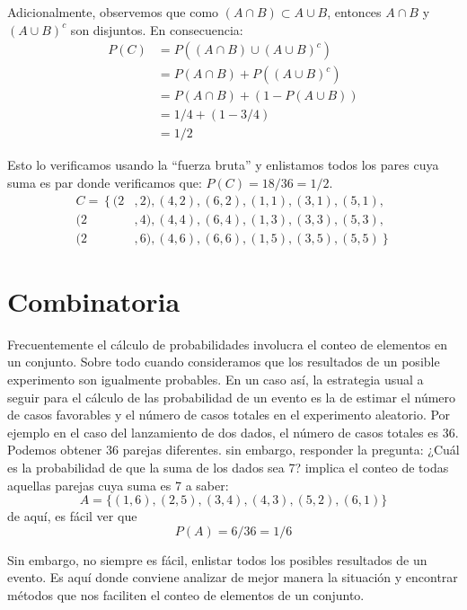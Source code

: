 \documentclass[14pt]{extreport}
\newcounter{ejemplo}[chapter]
\begin{document}
Adicionalmente, observemos que como $(A \cap B) \subset A \cup B$, entonces $A \cap B$ y $(A
  \cup B)^c$ son disjuntos. En consecuencia:
\begin{equation*}
  \begin{split}
    P(C ) & = P((A \cap B) \cup (A \cup B)^c ) \\
    & = P(A \cap B) + P((A \cup B)^c )    \\
    & = P(A \cap B) + (1 - P(A \cup B)) \\
    & = 1/4 + (1-3/4)\\
    & = 1/2
  \end{split}
\end{equation*}

Esto lo verificamos usando la ``fuerza bruta'' y enlistamos todos los pares cuya suma es par donde verificamos que: $P(C ) = 18/36 = 1/2$.
\begin{equation*}
  \begin{split}
    C = \left\{\right. (2&, 2), (4, 2), (6, 2),(1, 1), (3, 1), (5, 1),\\
    (2&, 4), (4, 4), (6, 4),(1, 3), (3, 3), (5, 3),\\
    (2&, 6), (4, 6), (6, 6),(1, 5), (3, 5), (5, 5)\left.\right\}
  \end{split}
\end{equation*}
\chapter{Combinatoria}
Frecuentemente el cálculo de probabilidades involucra el conteo de elementos en un conjunto. Sobre todo cuando consideramos que los resultados de un posible experimento son igualmente probables. En un caso así, la estrategia usual a seguir para el cálculo de las probabilidad de un evento es la de estimar el número de casos favorables y el número de casos totales en el experimento aleatorio. Por ejemplo en el caso del lanzamiento de dos dados, el número de casos totales es 36. Podemos obtener 36 parejas diferentes. sin embargo, responder la pregunta: ¿Cuál es la probabilidad de que la suma de los dados sea 7? implica el conteo de todas aquellas parejas cuya suma es 7 a saber:
$$
  A = \{(1, 6), (2, 5), (3, 4), (4, 3), (5, 2), (6, 1)\}
$$
de aquí, es fácil ver que
$$
  P(A) = 6/36 = 1/6
$$

Sin embargo, no siempre es fácil, enlistar todos los
posibles resultados de un evento. Es aquí donde conviene analizar de
mejor manera la situación y encontrar métodos que nos faciliten el
conteo de elementos de un conjunto.
\end{document}
